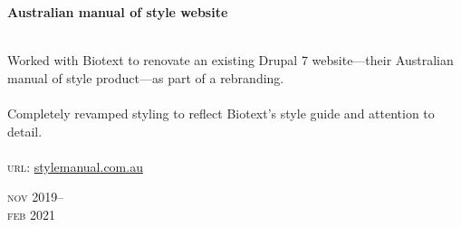\begin{minipage}[t]{\mainboxwidth\textwidth}
\textbf{Australian manual of style website}\\
{\small
\\
Worked with Biotext to renovate an existing Drupal 7 website—their Australian manual of style product—as part of a rebranding.\\
\\
Completely revamped styling to reflect Biotext's style guide and attention to detail.\\ 
\\
\textsc{url}: \href{https://stylemanual.com.au}{stylemanual.com.au} 
\par
}
\end{minipage}
\begin{minipage}[t]{\detailboxwidth\textwidth}
{
\hfill \textsc{nov} 2019--\\ 
\hspace*{0pt} \hfill \textsc{feb} 2021
\par
}
\end{minipage}
\\



